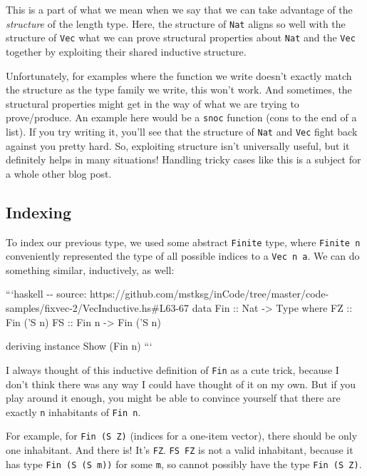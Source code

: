 \documentclass[]{article}
\begin{document}
This is a part of what we mean when we say that we can take advantage of the
\emph{structure} of the length type. Here, the structure of \texttt{Nat} aligns
so well with the structure of \texttt{Vec} what we can prove structural
properties about \texttt{Nat} and the \texttt{Vec} together by exploiting their
shared inductive structure.

Unfortunately, for examples where the function we write doesn't exactly match
the structure as the type family we write, this won't work. And sometimes, the
structural properties might get in the way of what we are trying to
prove/produce. An example here would be a \texttt{snoc} function (cons to the
end of a list). If you try writing it, you'll see that the structure of
\texttt{Nat} and \texttt{Vec} fight back against you pretty hard. So, exploiting
structure isn't universally useful, but it definitely helps in many situations!
Handling tricky cases like this is a subject for a whole other blog post.

\subsection{Indexing}

To index our previous type, we used some abstract \texttt{Finite} type, where
\texttt{Finite\ n} conveniently represented the type of all possible indices to
a \texttt{Vec\ n\ a}. We can do something similar, inductively, as well:

```haskell -\/- source:
https://github.com/mstksg/inCode/tree/master/code-samples/fixvec-2/VecInductive.hs\#L63-67
data Fin :: Nat -\textgreater{} Type where FZ :: Fin ('S n) FS :: Fin n
-\textgreater{} Fin ('S n)

deriving instance Show (Fin n) ```

I always thought of this inductive definition of \texttt{Fin} as a cute trick,
because I don't think there was any way I could have thought of it on my own.
But if you play around it enough, you might be able to convince yourself that
there are exactly \texttt{n} inhabitants of \texttt{Fin\ n}.

For example, for \texttt{Fin\ (\textquotesingle{}S\ \textquotesingle{}Z)}
(indices for a one-item vector), there should be only one inhabitant. And there
is! It's \texttt{FZ}. \texttt{FS\ FZ} is not a valid inhabitant, because it has
type \texttt{Fin\ (\textquotesingle{}S\ (\textquotesingle{}S\ m))} for some
\texttt{m}, so cannot possibly have the type
\texttt{Fin\ (\textquotesingle{}S\ \textquotesingle{}Z)}.
\end{document}
